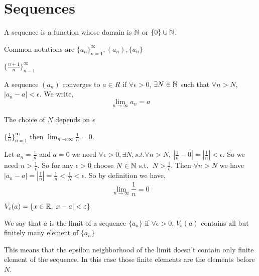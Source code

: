 \section{Sequences}
\begin{definition}[Sequences]
    A sequence is a function whose domain is $\mathbb{N}$ or $\{0\} \cup \mathbb{N}$.
\end{definition}
\begin{remark}
    Common notations are $\{a_n\}_{n = 1}^{\infty}, (a_n), \{a_n\}$
\end{remark}
\begin{eg}
 $\{\frac{n + 1}{n}\}^{\infty}_{n - 1}$
\end{eg}


\begin{definition}
A sequence $(a_n )$ converges to $a \in R$ if $\forall \epsilon > 0$,  $\exists N \in \mathbb{N}$ such that  $\forall n > N$,  $|a_n - a| < \epsilon$. We write, 
$$ \lim_{n \to \infty} a_n = a $$ 
\end{definition}
\begin{remark}
    The choice of $N$ depends on $\epsilon$
\end{remark}
\begin{eg}
    $\{\frac{1}{n} \}_{n = 1}^{ \infty}$  then $\lim_{n \to \infty} \frac{1}{n} = 0$.

Let $a_n = \frac{1}{n}$ and $a = 0$ we need  $\forall \epsilon > 0, \exists N, s.t. \forall n > N, \: |\frac{1}{n} - 0| = |\frac{1}{n}| < \epsilon$. So we need $n > \frac{1}{\epsilon}$. So for any $\epsilon > 0$ choose  $N \in \mathbb{N}$ s.t.  $\: N > \frac{1}{\epsilon}$. Then $\forall n > N$ we have  $|a_n  - a| = |\frac{1}{n}| = \frac{1}{n} < \frac{1}{N} < \epsilon$. So by definition we have, 
$$ \lim_{n \to \infty} \frac{1}{n} = 0 $$ 
\end{eg}


\begin{notation}
    $V_{\varepsilon}(a) = \{x \in \mathbb{R}, |x - a| < \varepsilon \}$ 
\end{notation}

\begin{definition}
    We say that $a$ is the limit of a sequence $\{a_n\}$ if  $\forall \epsilon > 0$,  $V_\epsilon(a)$ contains all but finitely many element of  $\{a_n\}$
\end{definition}
\begin{remark}
    This means that the epsilon neighborhood of the limit doesn't contain only finite element of the sequence. In this case those finite elements are the elements before $N$. 
\end{remark}

